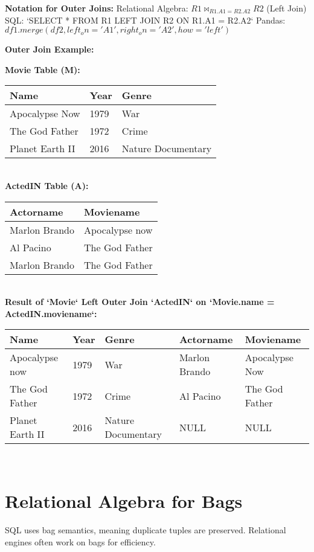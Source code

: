 \documentclass{article}
\newcommand{\ljoin}{\Join} %
\begin{document}
\textbf{Notation for Outer Joins:} 
Relational Algebra: $R1 \ljoin_{R1.A1=R2.A2} R2$ (Left Join)
SQL: `SELECT * FROM R1 LEFT JOIN R2 ON R1.A1 = R2.A2`
Pandas: $df1.merge(df2, left_on='A1', right_on='A2', how='left')$

\textbf{Outer Join Example:} 

\textbf{Movie Table (M):} \\

\begin{tabular}{|l|l|l|}
    \hline
    \textbf{Name} & \textbf{Year} & \textbf{Genre} \\
    \hline
    Apocalypse Now & 1979 & War \\
    The God Father & 1972 & Crime \\
    Planet Earth II & 2016 & Nature Documentary \\
    \hline
\end{tabular}\\

\textbf{ActedIN Table (A):} \\

\begin{tabular}{|l|l|}
    \hline
    \textbf{Actorname} & \textbf{Moviename} \\
    \hline
    Marlon Brando & Apocalypse now \\
    Al Pacino & The God Father \\
    Marlon Brando & The God Father \\
    \hline
\end{tabular}\\


\textbf{Result of `Movie` Left Outer Join `ActedIN` on `Movie.name = ActedIN.moviename`:} \\

\begin{tabular}{|l|l|l|l|l|}
    \hline
    \textbf{Name} & \textbf{Year} & \textbf{Genre} & \textbf{Actorname} & \textbf{Moviename} \\
    \hline
    Apocalypse now & 1979 & War & Marlon Brando & Apocalypse Now \\
    The God Father & 1972 & Crime & Al Pacino & The God Father \\
    Planet Earth II & 2016 & Nature Documentary & NULL & NULL \\
    \hline
\end{tabular}\\


\section*{Relational Algebra for Bags} 
SQL uses bag semantics, meaning duplicate tuples are preserved. Relational engines often work on bags for efficiency. \\
\end{document}

